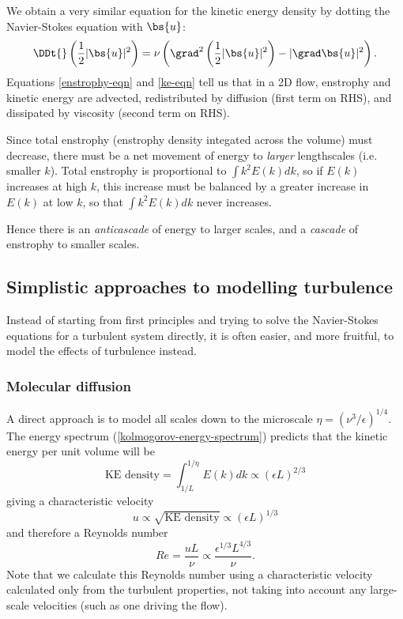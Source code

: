 We obtain a very similar equation for the kinetic energy density by dotting the
Navier-Stokes equation with $\bs{u}$:
\begin{equation}
    \DDt{}\left(\frac{1}{2}|\bs{u}|^2\right) 
    = \nu\left(\grad^2 \left( \frac{1}{2}|\bs{u}|^2 \right) - |\grad\bs{u}|^2\right).
 \label{ke-eqn}
\end{equation}
Equations \ref{enstrophy-eqn} and \ref{ke-eqn} tell us that in a 2D flow, enstrophy and kinetic energy are advected, redistributed by diffusion (first term on RHS), and dissipated by viscosity (second term on RHS).

Since total enstrophy (enstrophy density integated across the volume) must
decrease, there must be a net movement of energy to \textit{larger} lengthscales
(i.e.  smaller $k$). Total enstrophy is proportional to $\int k^2E(k) dk$, so if
$E(k)$ increases at high $k$, this increase must be balanced by a greater
increase in $E(k)$ at low $k$, so that $\int k^2E(k) dk$ never increases.

Hence there is an \textit{anticascade} of energy to larger scales, and a
\textit{cascade} of enstrophy to smaller scales.

\subsection{Simplistic approaches to modelling turbulence}

Instead of starting from first principles and trying to solve the Navier-Stokes equations for a turbulent system directly, it is often easier, and more fruitful, to model the effects of turbulence instead.

\subsubsection{Molecular diffusion}

A direct approach is to model all scales down to the microscale
$\eta=(\nu^3/\epsilon)^{1/4}$. The energy spectrum
(\ref{kolmogorov-energy-spectrum}) predicts that the kinetic energy 
per unit volume will be 
\begin{equation}
    \text{KE density} = \int_{1/L}^{1/\eta} E(k) dk \propto (\epsilon L)^{2/3}
\end{equation}
giving a characteristic velocity
\begin{equation}
    u \propto \sqrt{\text{KE density}} \propto (\epsilon L)^{1/3}
\end{equation}
and therefore a Reynolds number
\begin{equation}
    Re = \frac{uL}{\nu} \propto \frac{\epsilon^{1/3} L^{4/3}}{\nu}.
\end{equation}
Note that we calculate this Reynolds number using a characteristic velocity
calculated only from the turbulent properties, not taking into account any
large-scale velocities (such as one driving the flow). 

